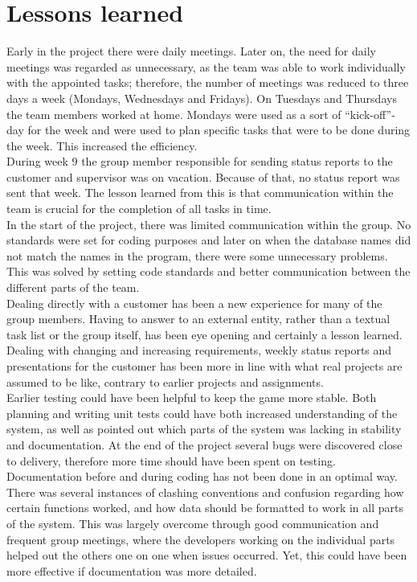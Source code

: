 \section{Lessons learned}

Early in the project there were daily meetings. Later on, the need for daily meetings was regarded as unnecessary, as the team was able to work individually with the appointed tasks; therefore, the number of meetings was reduced to three days a week (Mondays, Wednesdays and Fridays). On Tuesdays and Thursdays the team members worked at home. Mondays were used as a sort of “kick-off”-day for the week and were used to plan specific tasks that were to be done during the week. This increased the efficiency.\\
\newline
During week 9 the group member responsible for sending status reports to the customer and supervisor was on vacation. Because of that, no status report was sent that week. The lesson learned from this is that communication within the team is crucial for the completion of all tasks in time.\\
\newline
In the start of the project, there was limited communication within the group. No standards were set
for coding purposes and later on when the database names did not match the names in the program, there were some unnecessary problems. This was solved by setting code standards and better communication between the different parts of the team. \\
\newline
Dealing directly with a customer has been a new experience for many of the group members. Having to answer to an external entity, rather than a textual task list or the group itself, has been eye opening and certainly a lesson learned. Dealing with changing and increasing requirements, weekly status reports and presentations for the customer has been more in line with what real projects are assumed to be like, contrary to earlier projects and assignments.\\
\newline
Earlier testing could have been helpful to keep the game more stable. Both planning and writing unit tests could have both increased understanding of the system, as well as pointed out which parts of the system was lacking in stability and documentation. At the end of the project several bugs were discovered close to delivery, therefore more time should have been spent on testing.\\
\newline
Documentation before and during coding has not been done in an optimal way. There was several instances of clashing conventions and confusion regarding how certain functions worked, and how data should be formatted to work in all parts of the system. This was largely overcome through good communication and frequent group meetings, where the developers working on the individual parts helped out the others one on one when issues occurred. Yet, this could have been more effective if documentation was more detailed.\\





